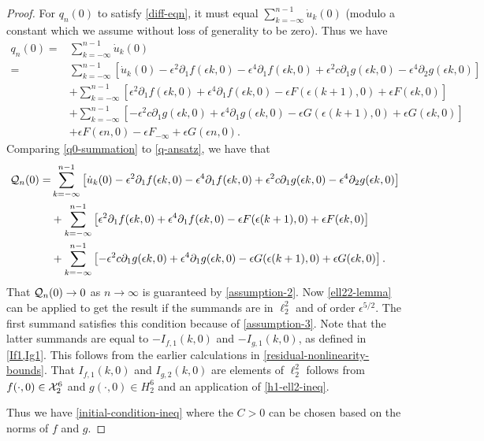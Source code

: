 \begin{proof}
	For \(q_n(0)\) to satisfy \cref{diff-eqn}, it must equal \(\sum_{k=-\infty}^{n-1} \dot u_k(0)\) (modulo a constant which we assume without loss of generality to be zero). Thus we have
	\begin{equation}\label{q0-summation}
	\begin{aligned}	
		q_n(0) =& \sum_{k=-\infty}^{n-1} \dot u_k(0)\\
		=& \sum_{k=-\infty}^{n-1}\left[ \dot u_k(0) - \epsilon^2 \partial_1 f(\epsilon k,0) - \epsilon^4 \partial_1 f(\epsilon k,0) + \epsilon^2 c \partial_1 g(\epsilon k,0) - \epsilon^4 \partial_2g(\epsilon k,0)\right] \\
		&+\sum_{k=-\infty}^{n-1}\left[  \epsilon^2 \partial_1 f(\epsilon k,0) +\epsilon^4 \partial_1 f(\epsilon k,0) - \epsilon F(\epsilon(k+1),0) +\epsilon F(\epsilon k ,0)  \right] \\
		&+ \sum_{k=-\infty}^{n-1}\left[ - \epsilon^2 c\partial_1 g(\epsilon k,0) +\epsilon^4 \partial_1 g(\epsilon k,0) - \epsilon G(\epsilon(k+1),0) +\epsilon G(\epsilon k ,0)  \right] \\
		&+ \epsilon F(\epsilon n, 0) - \epsilon F_{-\infty} + \epsilon G(\epsilon n, 0).
	\end{aligned}
	\end{equation}
	Comparing \cref{q0-summation} to \cref{q-ansatz}, we have that 
	 \begin{equation}\label{mcq-zero}
	 \begin{aligned}
		\mathcal{Q}_n(0) =& \sum_{k=-\infty}^{n-1}\left[ \dot u_k(0) - \epsilon^2 \partial_1 f(\epsilon k,0) - \epsilon^4 \partial_1 f(\epsilon k,0) + \epsilon^2 c \partial_1 g(\epsilon k,0) - \epsilon^4 \partial_2g(\epsilon k,0)\right] \\
		&+\sum_{k=-\infty}^{n-1}\left[  \epsilon^2 \partial_1 f(\epsilon k,0) +\epsilon^4 \partial_1 f(\epsilon k,0) - \epsilon F(\epsilon(k+1),0) +\epsilon F(\epsilon k ,0)  \right] \\
		&+ \sum_{k=-\infty}^{n-1}\left[ - \epsilon^2 c\partial_1 g(\epsilon k,0) +\epsilon^4 \partial_1 g(\epsilon k,0) - \epsilon G(\epsilon(k+1),0) +\epsilon G(\epsilon k ,0)  \right].
	\end{aligned}
	\end{equation}
	That \(\mathcal{Q}_n(0)\to 0\) as \(n\to\infty\) is guaranteed by \cref{assumption-2}. Now \cref{ell22-lemma} can be applied to get the result if the summands are in \(\ell^2_2\) and of order \(\epsilon^{5/2}\). The first summand satisfies this condition because of \cref{assumption-3}.  Note that the latter summands are equal to \(-I_{f,1}(k,0)\) and \(-I_{g,1}(k,0)\), as defined in \cref{If1,Ig1}. This follows from the earlier calculations in \cref{residual-nonlinearity-bounds}. That \(I_{f,1}(k,0)\) and \(I_{g,2}(k,0)\) are elements of \(\ell^2_2\) follows from \(f(\cdot, 0) \in \mathcal{X}^6_2\) and \(g(\cdot, 0) \in H^6_2\) and an application of \cref{h1-ell2-ineq}.
	
	Thus we have \cref{initial-condition-ineq} where the \(C>0\) can be chosen based on the norms of \(f\) and \(g\).
\end{proof}

